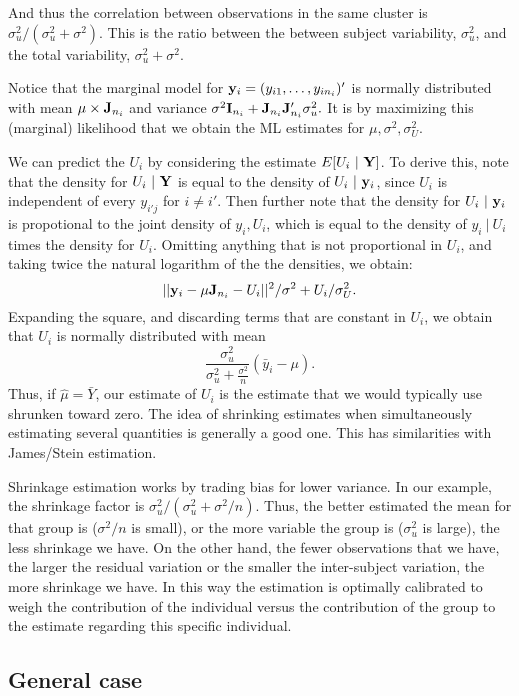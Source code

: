 And thus the correlation between observations in the same cluster is
$\sigma^2_u / (\sigma^2_u + \sigma^2)$. This is the ratio between
the between subject variability, $\sigma^2_u$, and the total variability,
$\sigma^2_u + \sigma^2$. 

Notice that the marginal model for $\mathbf{y}_i = (y_{i1}, \ldots, y_{in_i})'$ is
normally distributed with mean $\mu \times \mathbf{J}_{n_i}$ and variance 
$
\sigma^2 \mathbf{I}_{n_i} + \mathbf{J}_{n_i} \mathbf{J}_{n_i}' \sigma^2_{u}. 
$
It is by maximizing this (marginal) likelihood that we obtain the ML estimates 
for $\mu, \sigma^2, \sigma^2_U$. 

We can predict the $U_i$ by considering the estimate $E[U_i ~|~ \mathbf{Y}]$. To derive
this, note that the density for $U_i ~|~ \mathbf{Y}$ is equal to the density 
of $U_i ~|~ \mathbf{y}_i$, since $U_i$ is independent of every $y_{i'j}$ for $i \neq i'$. 
Then further note that the density for $U_i ~|~ \mathbf{y}_i$ is propotional to the
joint density of $y_i, U_i$, which is equal to the density of $y_i ~|~ U_i$ 
times the density for $U_i$. Omitting anything that is not proportional
in $U_i$, and taking twice the natural logarithm of the the densities, we obtain:
$$
||\mathbf{y}_i - \mu \mathbf{J}_{n_i} - U_i ||^2 / \sigma^2 + U_i / \sigma^2_U.
$$
Expanding the square, and discarding terms that are constant in $U_i$,
we obtain that $U_i$ is normally distributed with mean 
$$
\frac{\sigma^2_u}{\sigma^2_u + \frac{\sigma^2}{n}} (\bar y_i - \mu).
$$
Thus, if $\hat \mu = \bar Y$, our estimate of $U_i$ is the estimate that
we would typically use shrunken toward zero. The idea of shrinking estimates
when simultaneously estimating several quantities is generally a good one.
This has similarities with James/Stein estimation.

Shrinkage estimation works by trading bias for lower variance. In our example, 
the shrinkage factor is $\sigma^2_u / (\sigma^2_u + \sigma^2 /n)$. Thus, the
better estimated the mean for that group is ($\sigma^2 / n$ is small), or the more
variable the group is ($\sigma^2_u$ is large), the less shrinkage we have. On the
other hand, the fewer observations that we have, the larger the residual variation
or the smaller the inter-subject variation, the more shrinkage we have. In this
way the estimation is optimally calibrated to weigh the contribution of the individual
versus the contribution of the group to the estimate regarding this specific individual.


\subsection{General case}

